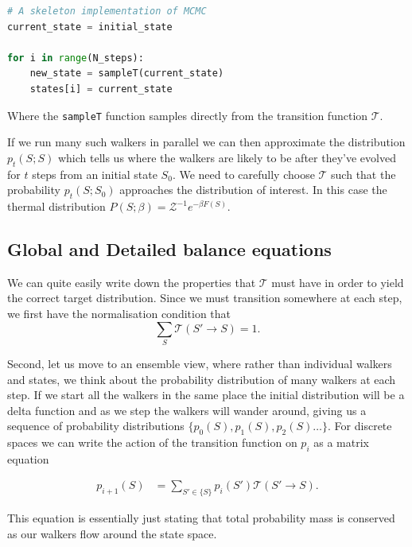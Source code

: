 \begin{lstlisting}[language=Python]
# A skeleton implementation of MCMC
current_state = initial_state

for i in range(N_steps):
    new_state = sampleT(current_state) 
    states[i] = current_state
\end{lstlisting}

Where the \passthrough{\lstinline!sampleT!} function samples directly from the transition function \(\mathcal{T}\).

If we run many such walkers in parallel we can then approximate the distribution \(p_t(S; S)\) which tells us where the walkers are likely to be after they've evolved for \(t\) steps from an initial state \(S_0\). We need to carefully choose \(\mathcal{T}\) such that the probability \(p_t(S; S_0)\) approaches the distribution of interest. In this case the thermal distribution \(P(S; \beta) = \mathcal{Z}^{-1} e^{-\beta F(S)}\).

\hypertarget{global-and-detailed-balance-equations}{%
\subsection{Global and Detailed balance equations}\label{global-and-detailed-balance-equations}}

We can quite easily write down the properties that \(\mathcal{T}\) must have in order to yield the correct target distribution. Since we must transition somewhere at each step, we first have the normalisation condition that \[\sum\limits_S \mathcal{T}(S' \rightarrow S) = 1.\]

Second, let us move to an ensemble view, where rather than individual walkers and states, we think about the probability distribution of many walkers at each step. If we start all the walkers in the same place the initial distribution will be a delta function and as we step the walkers will wander around, giving us a sequence of probability distributions \(\{p_0(S), p_1(S), p_2(S)\ldots\}\). For discrete spaces we can write the action of the transition function on \(p_i\) as a matrix equation

\[\begin{aligned}
p_{i+1}(S) &= \sum_{S' \in \{S\}} p_i(S') \mathcal{T}(S' \rightarrow S).
\end{aligned}\]

This equation is essentially just stating that total probability mass is conserved as our walkers flow around the state space.

